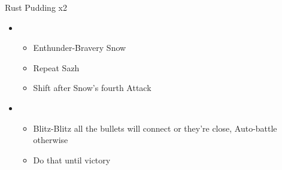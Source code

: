 \documentclass{report}
\begin{document}
\begin{battle}{Rust Pudding x2}
\begin{itemize}
    \item \third
    \begin{itemize}
        \item Enthunder-Bravery Snow
        \item Repeat Sazh
        \item Shift after Snow's fourth Attack
    \end{itemize}
    \item \second
    \begin{itemize}
        \item Blitz-Blitz all the bullets will connect or they're close, Auto-battle otherwise
        \item Do that until victory
    \end{itemize}
\end{itemize}
\end{battle}
\end{document}
